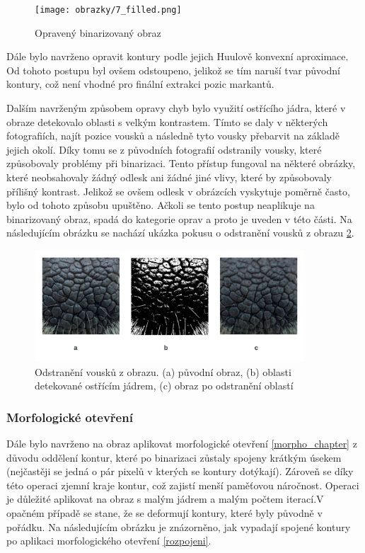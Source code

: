 \begin{figure}[h]
	\centering
	\texttt{[image: obrazky/7\_filled.png]}
	\caption{Opravený binarizovaný obraz}
	\label{filled}
\end{figure} 

Dále bylo navrženo opravit kontury podle jejich Huulově konvexní aproximace. Od tohoto postupu byl ovšem odstoupeno, jelikož se tím naruší tvar původní kontury, což není vhodné pro finální extrakci pozic markantů. 

Dalším navrženým způsobem opravy chyb bylo využití ostřícího jádra, které v obraze detekovalo oblasti s velkým kontrastem. Tímto se daly v některých fotografiích, najít  pozice vousků a následně tyto vousky přebarvit na základě jejich okolí. Díky tomu se z původních fotografií odstranily vousky, které způsobovaly problémy při binarizaci. Tento přístup fungoval na některé obrázky, které neobsahovaly žádný odlesk ani žádné jiné vlivy, které by způsobovaly přílišný kontrast. Jelikož se ovšem odlesk v obrázcích vyskytuje poměrně často, bylo od tohoto způsobu upuštěno. Ačkoli se tento postup neaplikuje na binarizovaný obraz, spadá do kategorie oprav a proto je uveden v této části. Na následujícím obrázku se nachází ukázka pokusu o odstranění vousků z obrazu \ref{vousky}.

\begin{figure}[h]
	\centering
	\includegraphics[width=0.9\textwidth]{obrazky/vousky.png}
	\caption{Odstranění vousků z obrazu. (a) původní obraz, (b) oblasti detekované ostřícím jádrem, (c) obraz po odstranění oblastí}
	\label{vousky}
\end{figure} 

\subsubsection{Morfologické otevření}

Dále bylo navrženo na obraz aplikovat morfologické otevření \ref{morpho_chapter} z důvodu oddělení kontur, které po binarizaci zůstaly spojeny krátkým úsekem (nejčastěji se jedná o pár pixelů v kterých se kontury dotýkají). Zároveň se díky této operaci zjemní kraje kontur, což zajistí menší paměťovou náročnost. Operaci je důležité aplikovat na obraz s malým jádrem a malým počtem iterací.V opačném případě se stane, že se deformují kontury, které byly původně v pořádku. Na následujícím obrázku je znázorněno, jak vypadají spojené kontury po aplikaci morfologického otevření \ref{rozpojeni}.

